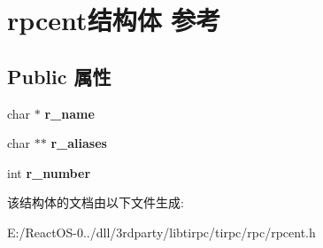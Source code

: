 \hypertarget{structrpcent}{}\section{rpcent结构体 参考}
\label{structrpcent}
\subsection*{Public 属性}
\begin{DoxyCompactItemize}
\item 
\mbox{\label{structrpcent_a42ba13c2cd06cdc425897be2b858a26a}} 
char $\ast$ {\bfseries r\+\_\+name}
\item 
\mbox{\label{structrpcent_a1cebfd67aba5fc74306e4ea5d4427093}} 
char $\ast$$\ast$ {\bfseries r\+\_\+aliases}
\item 
\mbox{\label{structrpcent_a9b208aebe40575a085ce3186471737bc}} 
int {\bfseries r\+\_\+number}
\end{DoxyCompactItemize}


该结构体的文档由以下文件生成\+:\begin{DoxyCompactItemize}
\item 
E\+:/\+React\+O\+S-\/0../dll/3rdparty/libtirpc/tirpc/rpc/rpcent.\+h\end{DoxyCompactItemize}
